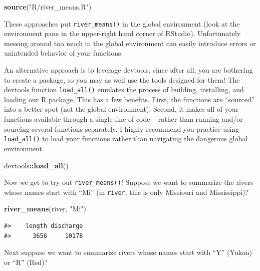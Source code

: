 \documentclass[
]{book}
\newenvironment{Shaded}{\begin{snugshade}}{\end{snugshade}}
\newcommand{\KeywordTok}[1]{\textcolor[rgb]{0.13,0.29,0.53}{\textbf{#1}}}
\newcommand{\NormalTok}[1]{#1}
\newcommand{\OperatorTok}[1]{\textcolor[rgb]{0.81,0.36,0.00}{\textbf{#1}}}
\newcommand{\StringTok}[1]{\textcolor[rgb]{0.31,0.60,0.02}{#1}}
\begin{document}
\begin{Shaded}
\begin{Highlighting}[]
\KeywordTok{source}\NormalTok{(}\StringTok{"R/river_means.R"}\NormalTok{)}
\end{Highlighting}
\end{Shaded}

These approaches put \texttt{river\_means()} in the global environment (look at the environment pane in the upper-right hand corner of RStudio). Unfortunately messing around too much in the global environment can easily introduce errors or unintended behavior of your functions.

An alternative approach is to leverage devtools, since after all, you are bothering to create a package, so you may as well use the tools designed for them! The devtools function \texttt{load\_all()} emulates the process of building, installing, and loading our R package. This has a few benefits. First, the functions are ``sourced'' into a better spot (not the global environment). Second, it makes all of your functions available through a single line of code -- rather than running and/or sourcing several functions separately. I highly recommend you practice using \texttt{load\_all()} to load your functions rather than navigating the dangerous global environment.

\begin{Shaded}
\begin{Highlighting}[]
\NormalTok{devtools}\OperatorTok{::}\KeywordTok{load_all}\NormalTok{()}
\end{Highlighting}
\end{Shaded}

Now we get to try out \texttt{river\_means()}! Suppose we want to summarize the rivers whose names start with ``Mi'' (in \texttt{river}, this is only Missiouri and Mississippi)?

\begin{Shaded}
\begin{Highlighting}[]
\KeywordTok{river_means}\NormalTok{(river, }\StringTok{"Mi"}\NormalTok{)}
\end{Highlighting}
\end{Shaded}

\begin{verbatim}
#>    length discharge 
#>      3656     10178
\end{verbatim}

Next suppose we want to summarize rivers whose names start with ``Y'' (Yukon) or ``R'' (Red)?
\end{document}
